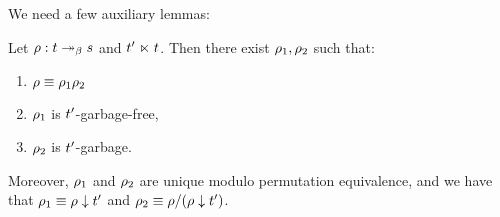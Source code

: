 
We need a few auxiliary lemmas:

\begin{lemma}
Let $\rho : t \mathrel{\twoheadrightarrow_\beta} s$ and $t' \mathrel{\ltimes} t$.
Then there exist $\rho_1,\rho_2$ such that:
\begin{enumerate}
\item $\rho \equiv \rho_1\rho_2$
\item $\rho_1$ is $t'$-garbage-free,
\item $\rho_2$ is $t'$-garbage.
\end{enumerate}
Moreover, $\rho_1$ and $\rho_2$ are unique modulo permutation equivalence,
and we have that
$\rho_1 \equiv \rho \downarrow t'$ and $\rho_2 \equiv \rho/(\rho \downarrow t')$.
\end{lemma}
